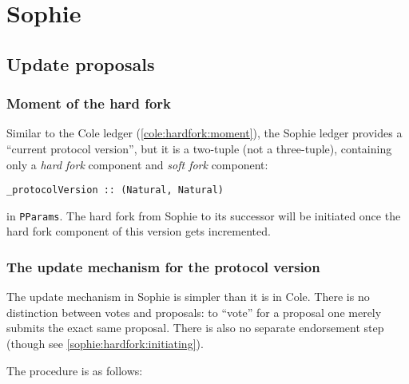 \chapter{Sophie}

\section{Update proposals}
\label{sophie:hardfork}

\subsection{Moment of the hard fork}
\label{sophie:hardfork:moment}

Similar to the Cole ledger (\cref{cole:hardfork:moment}), the Sophie ledger
provides a ``current protocol version'', but it is a two-tuple (not a
three-tuple), containing only a \emph{hard fork} component and \emph{soft fork}
component:
%
\begin{lstlisting}
_protocolVersion :: (Natural, Natural)
\end{lstlisting}
%
in \lstinline!PParams!. The hard fork from Sophie to its successor will be
initiated once the hard fork component of this version gets incremented.

\subsection{The update mechanism for the protocol version}

The update mechanism in Sophie is simpler than it is in Cole. There is no
distinction between votes and proposals: to ``vote'' for a proposal one merely
submits the exact same proposal. There is also no separate endorsement step
(though see \cref{sophie:hardfork:initiating}).

The procedure is as follows:

